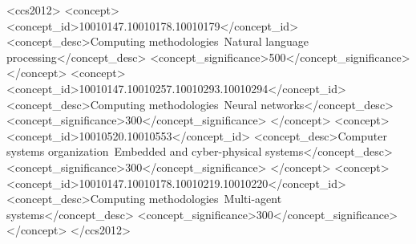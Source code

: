 \documentclass[acmsmall,screen,review]{acmart}
\begin{document}
\begin{CCSXML}
<ccs2012>
   <concept>
       <concept_id>10010147.10010178.10010179</concept_id>
       <concept_desc>Computing methodologies~Natural language processing</concept_desc>
       <concept_significance>500</concept_significance>
   </concept>
   <concept>
       <concept_id>10010147.10010257.10010293.10010294</concept_id>
       <concept_desc>Computing methodologies~Neural networks</concept_desc>
       <concept_significance>300</concept_significance>
   </concept>
   <concept>
       <concept_id>10010520.10010553</concept_id>
       <concept_desc>Computer systems organization~Embedded and cyber-physical systems</concept_desc>
       <concept_significance>300</concept_significance>
   </concept>
   <concept>
       <concept_id>10010147.10010178.10010219.10010220</concept_id>
       <concept_desc>Computing methodologies~Multi-agent systems</concept_desc>
       <concept_significance>300</concept_significance>
   </concept>
</ccs2012>
\end{CCSXML}



\maketitle

\glsresetall
















\end{document}
